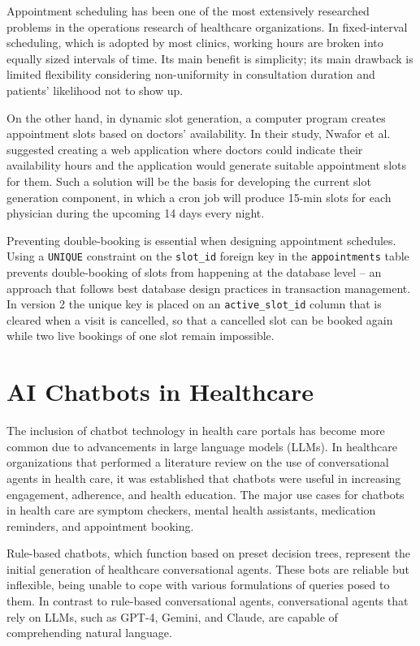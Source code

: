 Appointment scheduling has been one of the most extensively researched problems in the operations research of healthcare organizations. In fixed-interval scheduling, which is adopted by most clinics, working hours are broken into equally sized intervals of time. Its main benefit is simplicity; its main drawback is limited flexibility considering non-uniformity in consultation duration and patients' likelihood not to show up.

On the other hand, in dynamic slot generation, a computer program creates appointment slots based on doctors' availability. In their study, Nwafor et al. suggested creating a web application where doctors could indicate their availability hours and the application would generate suitable appointment slots for them. Such a solution will be the basis for developing the current slot generation component, in which a cron job will produce 15-min slots for each physician during the upcoming 14 days every night.

Preventing double-booking is essential when designing appointment schedules. Using a \texttt{UNIQUE} constraint on the \texttt{slot\_id} foreign key in the \texttt{appointments} table prevents double-booking of slots from happening at the database level – an approach that follows best database design practices in transaction management. In version 2 the unique key is placed on an \texttt{active\_slot\_id} column that is cleared when a visit is cancelled, so that a cancelled slot can be booked again while two live bookings of one slot remain impossible.

\FloatBarrier
\section{AI Chatbots in Healthcare}

The inclusion of chatbot technology in health care portals has become more common due to advancements in large language models (LLMs). In healthcare organizations that performed a literature review on the use of conversational agents in health care, it was established that chatbots were useful in increasing engagement, adherence, and health education. The major use cases for chatbots in health care are symptom checkers, mental health assistants, medication reminders, and appointment booking.

Rule-based chatbots, which function based on preset decision trees, represent the initial generation of healthcare conversational agents. These bots are reliable but inflexible, being unable to cope with various formulations of queries posed to them. In contrast to rule-based conversational agents, conversational agents that rely on LLMs, such as GPT-4, Gemini, and Claude, are capable of comprehending natural language.


